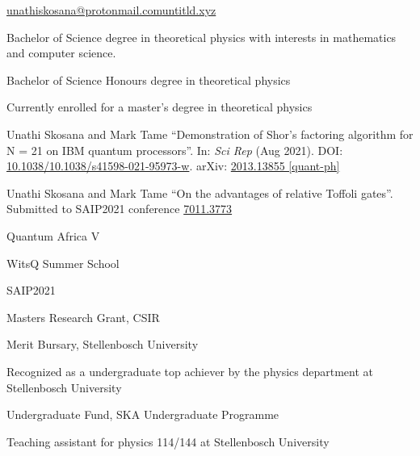 \documentclass{edelgas-resume}
\begin{document}
    \namehead %
    \address{}{\href{mailto:unathiskosana@protonmail.com}{unathiskosana@protonmail.com}}{\href{https://untitld.xyz}{untitld.xyz}} %


    \begin{position}{}{}
        \item Bachelor of Science degree in theoretical physics with interests
            in mathematics and computer science.
        \item Bachelor of Science Honours degree in theoretical physics
        \item Currently enrolled for a master's degree in theoretical physics
    \end{position}

    \begin{position}{}{}
    \item Unathi Skosana and Mark Tame \enquote{Demonstration of Shor’s factoring algorithm for N = 21 on IBM quantum processors}. In: \emph{Sci Rep} (Aug 2021). DOI: \href{https://doi.org/10.1038/s41598-021-95973-w}{10.1038/10.1038/s41598-021-95973-w}. arXiv: \href{https://arxiv.org/abs/2103.13855}{2013.13855 [quant-ph]}
    \end{position}

    \begin{position}{}{}
	\item Unathi Skosana and Mark Tame \enquote{On the advantages of relative Toffoli gates}. Submitted to SAIP2021 conference \href{https://events.saip.org.za/event/206/papers/7011/files/3773-on_the_advantages_of_relative_toffoli_gates.pdf}{7011.3773}
    \end{position}

    \begin{position}{}{}
        \item Quantum Africa V
        \item WitsQ Summer School 
        \item SAIP2021
    \end{position}

    \begin{position}{}{}
        \item Masters Research Grant, CSIR
        \item Merit Bursary, Stellenbosch University
		\item Recognized as a undergraduate top achiever by the physics department at Stellenbosch University
        \item Undergraduate Fund, SKA Undergraduate Programme
    \end{position}


    \begin{position}{}{}
        \item Teaching assistant for physics 114/144 at Stellenbosch University
    \end{position}
\end{document}
